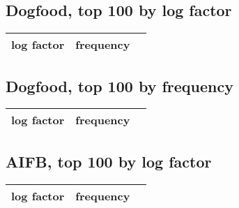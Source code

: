 \documentclass[letterpaper]{article} %
\begin{document}
%
%

\tiny
\subsection{Dogfood, top 100 by log factor}

\begin{longtable}{ r r p{10cm} }
 log factor & frequency & \\
\hline\endhead

 \hline
\end{longtable}
\subsection{Dogfood, top 100 by frequency}

\begin{longtable}{ r r p{10cm} }
 log factor & frequency & \\
\hline\endhead

 \hline
\end{longtable}

\subsection{AIFB, top 100 by log factor}

\begin{longtable}{ r r p{10cm} }
 log factor & frequency & \\
\hline\endhead

\hline
\end{longtable}
\end{document}
